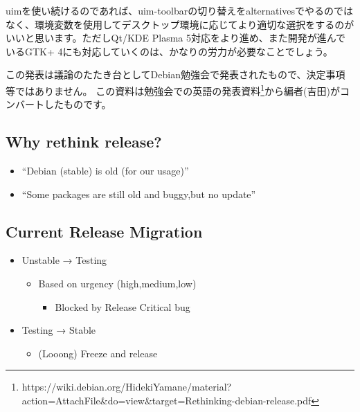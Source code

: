 \documentclass[mingoth,a4paper]{jsarticle}
\begin{document}
uimを使い続けるのであれば、uim-toolbarの切り替えをalternativesでやるのではなく、環境変数を使用してデスクトップ環境に応じてより適切な選択をするのがいいと思います。ただしQt/KDE
Plasma 5対応をより進め、また開発が進んでいるGTK+
4にも対応していくのは、かなりの労力が必要なことでしょう。



この発表は議論のたたき台としてDebian勉強会で発表されたもので、決定事項等ではありません。
この資料は勉強会での英語の発表資料\footnote{https://wiki.debian.org/HidekiYamane/material?action=AttachFile\&do=view\&target=Rethinking-debian-release.pdf}から編者(吉田)がコンバートしたものです。

\subsection{Why rethink release?}
\begin{itemize}
\item“Debian (stable) is old (for our usage)”
\item“Some packages are still old and buggy,but no update”
\end{itemize}

\subsection{Current Release Migration}
\begin{itemize}
 \item Unstable → Testing
  \begin{itemize}
   \item Based on urgency (high,medium,low)
    \begin{itemize}
     \item Blocked by Release Critical bug
    \end{itemize}
  \end{itemize}
 \item Testing → Stable
  \begin{itemize}
   \item (Looong) Freeze and release
  \end{itemize}
\end{itemize}
\end{document}
